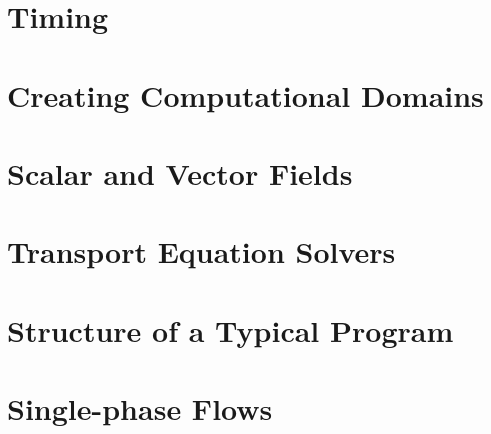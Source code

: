 \documentclass[a4paper]{book}
\begin{document}
  \chapter{Timing {\psiboil}}
  
  
  

  \chapter{Creating Computational Domains}
  
  
  
  
  
  

  \chapter{Scalar and Vector Fields}
  
  
  

  \chapter{Transport Equation Solvers}
    
    
   
  

  \chapter{Structure of a Typical {\psiboil} Program}
    

  \chapter{Single-phase Flows} 
  
  
  
  


  \printindex
\end{document}
